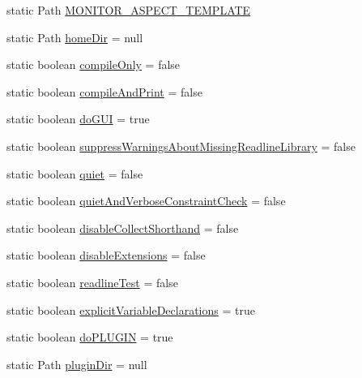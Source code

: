 \begin{DoxyCompactItemize}
\item 
static Path \hyperlink{classorg_1_1tzi_1_1use_1_1config_1_1_options_a5c5e7bc1805a38bf5a603c90a42fa90a}{M\-O\-N\-I\-T\-O\-R\-\_\-\-A\-S\-P\-E\-C\-T\-\_\-\-T\-E\-M\-P\-L\-A\-T\-E}
\item 
static Path \hyperlink{classorg_1_1tzi_1_1use_1_1config_1_1_options_ad29865f9afb2d693e5376ca494b9d13c}{home\-Dir} = null
\item 
static boolean \hyperlink{classorg_1_1tzi_1_1use_1_1config_1_1_options_a5db9fc9a8c668b5680192c87b85873a8}{compile\-Only} = false
\item 
static boolean \hyperlink{classorg_1_1tzi_1_1use_1_1config_1_1_options_a05cf418454b72a1f87b49328207aba9d}{compile\-And\-Print} = false
\item 
static boolean \hyperlink{classorg_1_1tzi_1_1use_1_1config_1_1_options_a2c1eb84d7fa9198111606521ceb958df}{do\-G\-U\-I} = true
\item 
static boolean \hyperlink{classorg_1_1tzi_1_1use_1_1config_1_1_options_a9690cdff39fd7a0c59215b0fb0513b85}{suppress\-Warnings\-About\-Missing\-Readline\-Library} = false
\item 
static boolean \hyperlink{classorg_1_1tzi_1_1use_1_1config_1_1_options_afa90cb8040fdaaa95daad1104497f707}{quiet} = false
\item 
static boolean \hyperlink{classorg_1_1tzi_1_1use_1_1config_1_1_options_ac44383047fdf7269df970a390ab2f3ad}{quiet\-And\-Verbose\-Constraint\-Check} = false
\item 
static boolean \hyperlink{classorg_1_1tzi_1_1use_1_1config_1_1_options_afd650554b2ebcd9702bf4b64aec94868}{disable\-Collect\-Shorthand} = false
\item 
static boolean \hyperlink{classorg_1_1tzi_1_1use_1_1config_1_1_options_ab244e4bc25c77671a1f58fe8e11c448e}{disable\-Extensions} = false
\item 
static boolean \hyperlink{classorg_1_1tzi_1_1use_1_1config_1_1_options_a644a8f13a045a945f92ed72675b3628e}{readline\-Test} = false
\item 
static boolean \hyperlink{classorg_1_1tzi_1_1use_1_1config_1_1_options_a84fcb768828dbb675d8db2f6d90674c7}{explicit\-Variable\-Declarations} = true
\item 
static boolean \hyperlink{classorg_1_1tzi_1_1use_1_1config_1_1_options_ab0bda39e9adf6142fb29e18fb4d277c7}{do\-P\-L\-U\-G\-I\-N} = true
\item 
static Path \hyperlink{classorg_1_1tzi_1_1use_1_1config_1_1_options_ab9d2183970e6f0a366d10163c0ba0655}{plugin\-Dir} = null

\end{DoxyCompactItemize}

